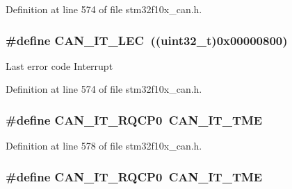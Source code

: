 Definition at line 574 of file stm32f10x\+\_\+can.\+h.

\subsubsection[{\texorpdfstring{C\+A\+N\+\_\+\+I\+T\+\_\+\+L\+EC}{CAN_IT_LEC}}]{\setlength{\rightskip}{0pt plus 5cm}\#define C\+A\+N\+\_\+\+I\+T\+\_\+\+L\+EC~(({\bf uint32\+\_\+t})0x00000800)}\hypertarget{group___c_a_n__interrupts_gad670b6f001bf67f24e17d91ada50a61c}{}\label{group___c_a_n__interrupts_gad670b6f001bf67f24e17d91ada50a61c}
Last error code Interrupt 

Definition at line 574 of file stm32f10x\+\_\+can.\+h.

\subsubsection[{\texorpdfstring{C\+A\+N\+\_\+\+I\+T\+\_\+\+R\+Q\+C\+P0}{CAN_IT_RQCP0}}]{\setlength{\rightskip}{0pt plus 5cm}\#define C\+A\+N\+\_\+\+I\+T\+\_\+\+R\+Q\+C\+P0~{\bf C\+A\+N\+\_\+\+I\+T\+\_\+\+T\+ME}}\hypertarget{group___c_a_n__interrupts_ga0c57058d6d14b2baa24a4895975b1371}{}\label{group___c_a_n__interrupts_ga0c57058d6d14b2baa24a4895975b1371}


Definition at line 578 of file stm32f10x\+\_\+can.\+h.

\subsubsection[{\texorpdfstring{C\+A\+N\+\_\+\+I\+T\+\_\+\+R\+Q\+C\+P0}{CAN_IT_RQCP0}}]{\setlength{\rightskip}{0pt plus 5cm}\#define C\+A\+N\+\_\+\+I\+T\+\_\+\+R\+Q\+C\+P0~{\bf C\+A\+N\+\_\+\+I\+T\+\_\+\+T\+ME}}\hypertarget{group___c_a_n__interrupts_ga0c57058d6d14b2baa24a4895975b1371}{}\label{group___c_a_n__interrupts_ga0c57058d6d14b2baa24a4895975b1371}


